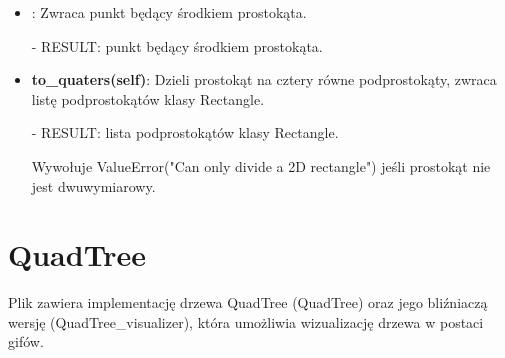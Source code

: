 \documentclass{lab}
\begin{document}
\begin{itemize}
  \item {}:
  Zwraca punkt będący środkiem prostokąta.

  - RESULT: punkt będący środkiem prostokąta.

  \item \textbf{to\_quaters(self)}:
  Dzieli prostokąt na cztery równe podprostokąty, zwraca listę podprostokątów klasy Rectangle.

  - RESULT: lista podprostokątów klasy Rectangle.

  Wywołuje ValueError("Can only divide a 2D rectangle") jeśli prostokąt nie jest dwuwymiarowy.
\end{itemize}

\section{QuadTree}
Plik zawiera implementację drzewa QuadTree (QuadTree) oraz jego bliźniaczą wersję (QuadTree\_visualizer), która umożliwia wizualizację drzewa w postaci gifów.
\end{document}
